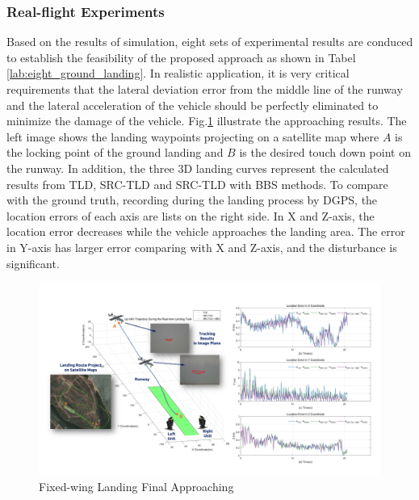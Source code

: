 \subsubsection{Real-flight Experiments}
Based on the results of simulation, eight sets of experimental results are conduced to establish the feasibility of the proposed approach as shown in Tabel \ref{lab:eight_ground_landing}. In realistic application, it is very critical requirements that the lateral deviation error from the middle line of the runway and the lateral acceleration of the vehicle should be perfectly eliminated to minimize the damage of the vehicle. Fig.\ref{fig:sci02_landing_results_big} illustrate the approaching results. The left image shows the landing waypoints projecting on a satellite map where $A$ is the locking point of the ground landing and $B$ is the desired touch down point on the runway. In addition, the three 3D landing curves represent the calculated results from TLD, SRC-TLD and SRC-TLD with BBS methods. To compare with the ground truth, recording during the landing process by DGPS, the location errors of each axis are lists on the right side. In X and Z-axis, the location error decreases while the vehicle approaches the landing area. The error in Y-axis has larger error comparing with X and Z-axis, and the disturbance is significant.

\begin{figure}[!th]
	\centering
	\includegraphics[width=\textwidth]{Figs/sci02_landing_results_big.pdf}	
	\caption{Fixed-wing Landing Final Approaching}
	\label{fig:sci02_landing_results_big}
\end{figure}



